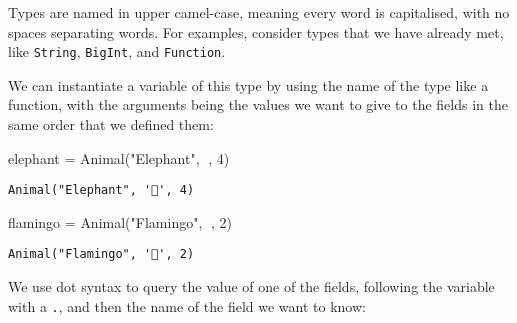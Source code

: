 \documentclass[
  letterpaper,
  DIV=11,
  numbers=noendperiod]{scrreprt}
\newenvironment{Shaded}{\begin{snugshade}}{\end{snugshade}}
\newcommand{\CharTok}[1]{\textcolor[rgb]{0.13,0.47,0.30}{#1}}
\newcommand{\FloatTok}[1]{\textcolor[rgb]{0.68,0.00,0.00}{#1}}
\newcommand{\FunctionTok}[1]{\textcolor[rgb]{0.28,0.35,0.67}{#1}}
\newcommand{\NormalTok}[1]{\textcolor[rgb]{0.00,0.23,0.31}{#1}}
\newcommand{\OperatorTok}[1]{\textcolor[rgb]{0.37,0.37,0.37}{#1}}
\newcommand{\StringTok}[1]{\textcolor[rgb]{0.13,0.47,0.30}{#1}}
\begin{document}
\begin{tcolorbox}[enhanced jigsaw, toprule=.15mm, opacitybacktitle=0.6, leftrule=.75mm, breakable, coltitle=black, bottomrule=.15mm, colbacktitle=quarto-callout-tip-color!10!white, bottomtitle=1mm, rightrule=.15mm, title=\textcolor{quarto-callout-tip-color}{\faLightbulb}\hspace{0.5em}{Convention}, colframe=quarto-callout-tip-color-frame, left=2mm, colback=white, opacityback=0, arc=.35mm, toptitle=1mm, titlerule=0mm]

Types are named in upper camel-case, meaning every word is capitalised,
with no spaces separating words. For examples, consider types that we
have already met, like \texttt{String}, \texttt{BigInt}, and
\texttt{Function}.

\end{tcolorbox}

We can instantiate a variable of this type by using the name of the type
like a function, with the arguments being the values we want to give to
the fields in the same order that we defined them:

\begin{Shaded}
\begin{Highlighting}[]
\NormalTok{elephant }\OperatorTok{=} \FunctionTok{Animal}\NormalTok{(}\StringTok{"Elephant"}\NormalTok{, }\CharTok{\textquotesingle{}🐘\textquotesingle{}}\NormalTok{, }\FloatTok{4}\NormalTok{)}
\end{Highlighting}
\end{Shaded}

\begin{verbatim}
Animal("Elephant", '🐘', 4)
\end{verbatim}

\begin{Shaded}
\begin{Highlighting}[]
\NormalTok{flamingo }\OperatorTok{=} \FunctionTok{Animal}\NormalTok{(}\StringTok{"Flamingo"}\NormalTok{, }\CharTok{\textquotesingle{}🦩\textquotesingle{}}\NormalTok{, }\FloatTok{2}\NormalTok{)}
\end{Highlighting}
\end{Shaded}

\begin{verbatim}
Animal("Flamingo", '🦩', 2)
\end{verbatim}

We use dot syntax to query the value of one of the fields, following the
variable with a \texttt{.}, and then the name of the field we want to
know:
\end{document}

